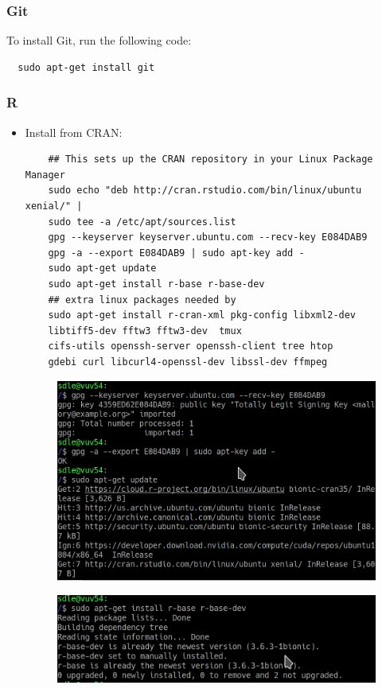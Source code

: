 \documentclass[10pt]{article} %
\begin{document}
\subsubsection{Git}
To install Git, run the following code:
\begin{lstlisting}
  sudo apt-get install git
\end{lstlisting}

\subsubsection{R}

\begin{itemize}

  \item Install from CRAN:

  \begin{lstlisting}
    ## This sets up the CRAN repository in your Linux Package Manager
    sudo echo "deb http://cran.rstudio.com/bin/linux/ubuntu xenial/" |
    sudo tee -a /etc/apt/sources.list
    gpg --keyserver keyserver.ubuntu.com --recv-key E084DAB9
    gpg -a --export E084DAB9 | sudo apt-key add -
    sudo apt-get update
    sudo apt-get install r-base r-base-dev
    ## extra linux packages needed by
    sudo apt-get install r-cran-xml pkg-config libxml2-dev
    libtiff5-dev fftw3 fftw3-dev  tmux
    cifs-utils openssh-server openssh-client tree htop
    gdebi curl libcurl4-openssl-dev libssl-dev ffmpeg

  \end{lstlisting}

  \pagebreak

  \begin{figure}[h!]
    \centering
    \includegraphics[width=0.7\linewidth]{figs/linux_r_install_gpgkeyserver}
    \caption{}
    \label{fig:linux_install_gdgpackages}
  \end{figure}

  \begin{figure}[h!]
    \centering
    \includegraphics[width=0.7\linewidth]{figs/linux_r_install_r_base}
    \caption{}
    \label{fig:linux_install_base_r}
  \end{figure}


\end{itemize}
\end{document}
